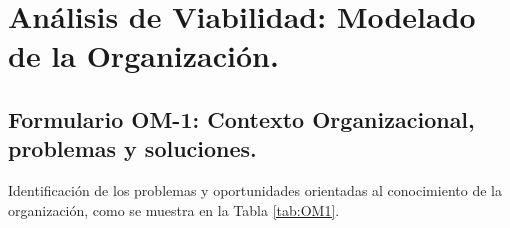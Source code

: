 

\chapter{Análisis de Viabilidad: Modelado de la Organización.}

\section{Formulario OM-1: Contexto Organizacional, problemas y soluciones.}
Identificación de los problemas y oportunidades orientadas al conocimiento de la organización, como se muestra en la Tabla \ref{tab:OM1}.


